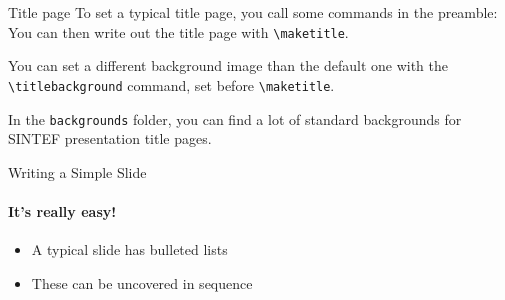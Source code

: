 \documentclass[10pt,aspectratio=169]{beamer}
\begin{document}
\begin{frame}[fragile]{Title page}
To set a typical title page, you call some commands in the preamble:
You can then write out the title page with \verb|\maketitle|.

You can set a different background image than the default one with the
\verb|\titlebackground| command, set before \verb|\maketitle|.

In the \texttt{backgrounds} folder, you can find a lot of standard backgrounds
for SINTEF presentation title pages.

\end{frame}

\begin{frame}[fragile]{Writing a Simple Slide}
\framesubtitle{It's really easy!}
\begin{itemize}[<+->]
\item A typical slide has bulleted lists
\item These can be uncovered in sequence
\end{itemize}
\end{frame}
\end{document}
